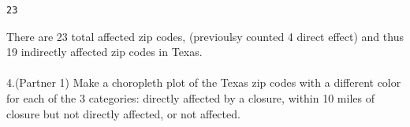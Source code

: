 \documentclass[
  letterpaper,
  DIV=11,
  numbers=noendperiod]{scrartcl}
\makeatletter
\let\oldparagraph\paragraph
\renewcommand{\paragraph}{
    \@ifstar
      \xxxParagraphStar
      \xxxParagraphNoStar
  }
\newcommand{\xxxParagraphStar}[1]{\oldparagraph*{#1}\mbox{}}
\newcommand{\xxxParagraphNoStar}[1]{\oldparagraph{#1}\mbox{}}
\makeatother
\begin{document}
\begin{verbatim}
23
\end{verbatim}

There are 23 total affected zip codes, (previoulsy counted 4 direct
effect) and thus 19 indirectly affected zip codes in Texas.

\paragraph{4.(Partner 1) Make a choropleth plot of the Texas zip codes
with a different color for each of the 3 categories: directly affected
by a closure, within 10 miles of closure but not directly affected, or
not
affected.}\label{partner-1-make-a-choropleth-plot-of-the-texas-zip-codes-with-a-different-color-for-each-of-the-3-categories-directly-affected-by-a-closure-within-10-miles-of-closure-but-not-directly-affected-or-not-affected.}
\end{document}
